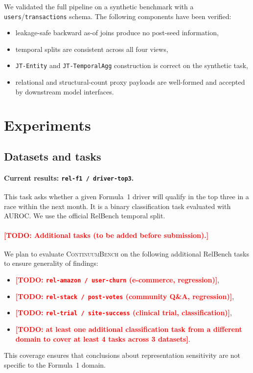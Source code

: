 \documentclass[11pt]{article}
\newcommand{\cb}{\textsc{ContinuumBench}}
\newcommand{\todo}[1]{\textcolor{red}{\textbf{[TODO: #1]}}}
\newcommand{\viewname}[1]{\texttt{#1}}
\begin{document}
We validated the full pipeline on a synthetic benchmark with a
\texttt{users}/\texttt{transactions} schema.
The following components have been verified:
\begin{itemize}
  \item leakage-safe backward as-of joins produce no post-seed
        information,
  \item temporal splits are consistent across all four views,
  \item \viewname{JT-Entity} and \viewname{JT-TemporalAgg} construction
        is correct on the synthetic task,
  \item relational and structural-count proxy payloads are well-formed and
        accepted by downstream model interfaces.
\end{itemize}

\section{Experiments}
\label{sec:experiments}

\subsection{Datasets and tasks}

\paragraph{Current results: \texttt{rel-f1 / driver-top3}.}
This task asks whether a given Formula~1 driver will qualify in the
top three in a race within the next month.
It is a binary classification task evaluated with AUROC.
We use the official RelBench temporal split.

\paragraph{\todo{Additional tasks (to be added before submission).}}
We plan to evaluate \cb{} on the following additional RelBench tasks
to ensure generality of findings:
\begin{itemize}
  \item \todo{\texttt{rel-amazon / user-churn} (e-commerce, regression)},
  \item \todo{\texttt{rel-stack / post-votes} (community Q\&A, regression)},
  \item \todo{\texttt{rel-trial / site-success} (clinical trial, classification)},
  \item \todo{at least one additional classification task from a
        different domain to cover at least 4 tasks across 3 datasets}.
\end{itemize}
This coverage ensures that conclusions about representation
sensitivity are not specific to the Formula~1 domain.
\end{document}
